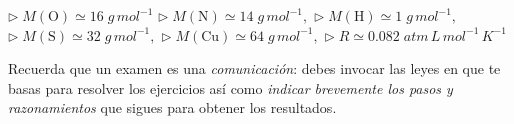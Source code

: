 \documentclass[a4paper,addpoints,14pt]{exam}
\newcommand*\chem[1]{\ensuremath{\mathrm{#1}}}
\newcommand{\halmos}{\vspace*{-6mm}
	
					\begin{flushright}
						\rule{1mm}{2.5mm} 
					\end{flushright}
					\vspace*{-4mm}
						
					  }
\renewcommand{\qed}{\halmos}
\begin{document}


\vspace*{\fill}

\begin{learn}
{$\triangleright\; M(\chem{O})\simeq16\;g\,mol^{-1}$\newline
$\triangleright\; M(\chem{N})\simeq14\;g\,mol^{-1},$\newline
$\triangleright\; M(\chem{H})\simeq1\;g\,mol^{-1},$\newline
$\triangleright\; M(\chem{S})\simeq32\;g\,mol^{-1},$\newline
$\triangleright\; M(\chem{Cu})\simeq64\;g\,mol^{-1},$\newline
$\triangleright\; R\simeq 0.082\;atm\,L\,mol^{-1}\,K^{-1}$}
\end{learn}	
		

\newpage
{}

\begin{problemas}{Recuerda que un examen es una \textit{comunicación}: debes invocar las leyes en que te basas para resolver los ejercicios así como \textit{indicar brevemente los pasos y razonamientos} que sigues para obtener los resultados.}
\end{problemas}
\vspace{1ex}
\end{document}
